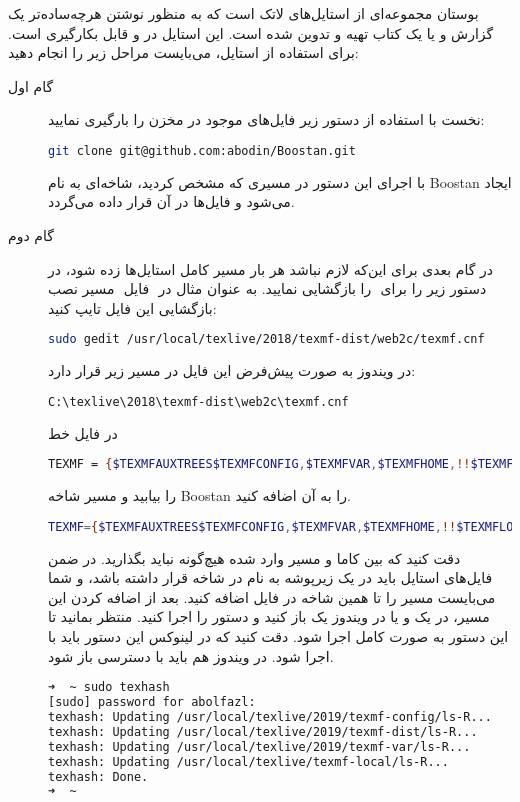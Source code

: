 \documentclass{report}
\begin{document}
بوستان مجموعه‌ای از استایل‌های لاتک است که به منظور نوشتن هرچه‌ساده‌تر یک گزارش و یا یک کتاب تهیه و تدوین شده است. این استایل در
 و 
قابل بکارگیری است. برای استفاده از استایل، می‌بایست مراحل زیر را انجام دهید:
\begin{description}
\item[گام اول]


نخست با استفاده از دستور زیر فایل‌های موجود در مخزن را بارگیری نمایید:
\begin{lstlisting}[language=bash]
git clone git@github.com:abodin/Boostan.git
\end{lstlisting}

 با اجرای این دستور در مسیری که مشخص کردید، شاخه‌ای به نام Boostan ایجاد می‌شود و فایل‌ها در آن قرار داده می‌گردد.
\item[گام دوم]
در گام بعدی برای این‌که لازم نباشد هر بار مسیر کامل استایل‌ها زده شود، در مسیر نصب ‎‎ فایل ‎‎ را بازگشایی نمایید. به عنوان مثال در ‎‎ دستور زیر را برای بازگشایی این فایل تایپ کنید:
\begin{lstlisting}[language=bash]
sudo gedit /usr/local/texlive/2018/texmf-dist/web2c/texmf.cnf
\end{lstlisting}
در ویندوز به صورت پیش‌فرض این فایل در مسیر زیر قرار دارد:
\begin{lstlisting}[language=bash]
 C:\texlive\2018\texmf-dist\web2c\texmf.cnf
\end{lstlisting}
در فایل
خط
\begin{lstlisting}[language=bash]
TEXMF = {$TEXMFAUXTREES$TEXMFCONFIG,$TEXMFVAR,$TEXMFHOME,!!$TEXMFLOCAL,!!$TEXMFSYSCONFIG,!!$TEXMFSYSVAR,!!$TEXMFDIST}
\end{lstlisting}
 را بیابید و مسیر شاخه Boostan را به آن اضافه کنید.
\begin{lstlisting}[language=bash]
TEXMF={$TEXMFAUXTREES$TEXMFCONFIG,$TEXMFVAR,$TEXMFHOME,!!$TEXMFLOCAL,!!$TEXMFSYSCONFIG,!!$TEXMFSYSVAR,!!$TEXMFDIST,/home/abolfazl/Documents/Boostan}
\end{lstlisting}
دقت کنید که بین کاما و مسیر وارد شده هیچ‌گونه
نباید بگذارید. در ضمن فایل‌های استایل باید در یک زیرپوشه به نام
در شاخه 
قرار داشته باشد، و شما می‌بایست مسیر را تا همین شاخه در فایل
 اضافه کنید. بعد از اضافه کردن این مسیر، در 
 یک  و یا در ویندوز یک 
باز کنید و دستور
را اجرا کنید. منتظر بمانید تا این دستور به صورت کامل اجرا شود. دقت کنید که در لینوکس این دستور باید با 
اجرا شود. در ویندوز هم باید 
با دسترسی 
باز شود. 
\begin{lstlisting}[language=bash]
➜  ~ sudo texhash
[sudo] password for abolfazl: 
texhash: Updating /usr/local/texlive/2019/texmf-config/ls-R... 
texhash: Updating /usr/local/texlive/2019/texmf-dist/ls-R... 
texhash: Updating /usr/local/texlive/2019/texmf-var/ls-R... 
texhash: Updating /usr/local/texlive/texmf-local/ls-R... 
texhash: Done.
➜  ~ 
\end{lstlisting}


\end{description}
\end{document}
